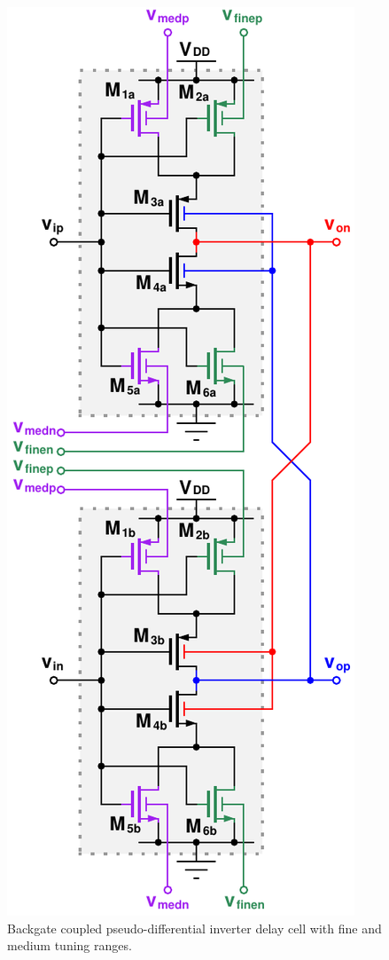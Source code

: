 			\begin{figure}[htb!]
			        \centering
			        \includegraphics[height=0.6\textheight, angle=0]{./figs/design/delay_cell_pd_inv}
			    \caption{Backgate coupled pseudo-differential inverter delay cell with fine and medium tuning ranges.}
			    \label{fig:pd_delay_cell_fine_med}
			\end{figure}

